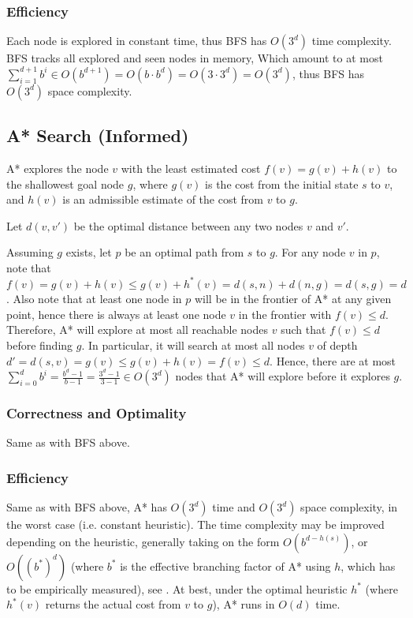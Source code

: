 \documentclass[runningheads]{llncs}
\begin{document}
\subsubsection{Efficiency}
Each node is explored in constant time, thus BFS has $O(3^d)$ time complexity. BFS tracks all explored and seen nodes in memory, Which amount to at most $\sum_{i=1}^{d+1} b^i \in O(b^{d+1}) = O(b \cdot b^d) = O(3 \cdot 3^d) = O(3^d)$, thus BFS has $O(3^d)$ space complexity.

\subsection{A* Search (Informed)}

A* explores the node $v$ with the least estimated cost $f(v) = g(v) + h(v)$ to the shallowest goal node $g$, where $g(v)$ is the cost from the initial state $s$ to $v$, and $h(v)$ is an admissible estimate of the cost from $v$ to $g$.

Let $d(v,v')$ be the optimal distance between any two nodes $v$ and $v'$.

Assuming $g$ exists, let $p$ be an optimal path from $s$ to $g$. For any node $v$ in $p$, note that $f(v) = g(v) + h(v) \leq g(v) + h^\ast(v) = d(s,n)+d(n,g) = d(s,g) = d$. Also note that at least one node in $p$ will be in the frontier of A* at any given point, hence there is always at least one node $v$ in the frontier with $f(v) \leq d$. Therefore, A* will explore at most all reachable nodes $v$ such that $f(v) \leq d$ before finding $g$. In particular, it will search at most all nodes $v$ of depth $d' = d(s,v) = g(v) \leq g(v)+h(v) = f(v) \leq d$. Hence, there are at most $\sum_{i=0}^d b^i = \frac{b^d-1}{b-1} = \frac{3^d-1}{3-1} \in O(3^d)$ nodes that A* will explore before it explores $g$.

\subsubsection{Correctness and Optimality}
Same as with BFS above.

\subsubsection{Efficiency}
Same as with BFS above, A* has $O(3^d)$ time and $O(3^d)$ space complexity, in the worst case (i.e. constant heuristic). The time complexity may be improved depending on the heuristic, generally taking on the form $O(b^{d-h(s)})$, or $O((b^\ast)^d)$ (where $b^\ast$ is the effective branching factor of A* using $h$, which has to be empirically measured), see \cite{AIMA-A*Complexity}. At best, under the optimal heuristic $h^\ast$ (where $h^\ast(v)$ returns the actual cost from $v$ to $g$), A* runs in $O(d)$ time.
\end{document}
